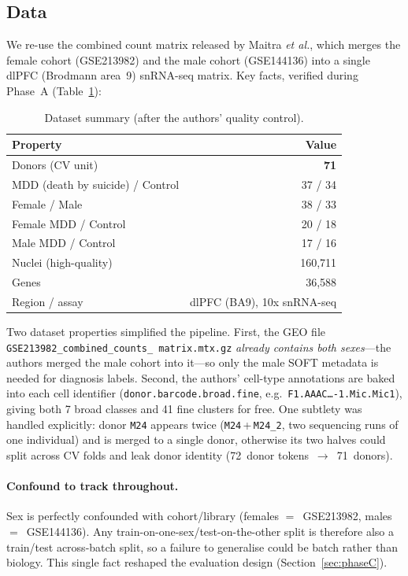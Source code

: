 \documentclass[11pt]{article}
\newcommand{\code}[1]{\texttt{\small #1}}
\begin{document}
\subsection{Data}

We re-use the combined count matrix released by Maitra \textit{et al.}, which
merges the female cohort (GSE213982) and the male cohort (GSE144136) into a
single dlPFC (Brodmann area~9) snRNA-seq matrix. Key facts, verified during
Phase~A (Table~\ref{tab:data}):

\begin{table}[h]
\centering
\caption{Dataset summary (after the authors' quality control).}
\label{tab:data}
\small
\begin{tabular}{lr}
\toprule
Property & Value \\
\midrule
Donors (CV unit) & \textbf{71} \\
\quad MDD (death by suicide) / Control & 37 / 34 \\
\quad Female / Male & 38 / 33 \\
\quad Female MDD / Control & 20 / 18 \\
\quad Male MDD / Control & 17 / 16 \\
Nuclei (high-quality) & 160{,}711 \\
Genes & 36{,}588 \\
Region / assay & dlPFC (BA9), 10x snRNA-seq \\
\bottomrule
\end{tabular}
\end{table}

Two dataset properties simplified the pipeline. First, the GEO file
\code{GSE213982\_\allowbreak combined\_\allowbreak counts\_\allowbreak
matrix.mtx.gz} \emph{already contains both sexes}---the authors merged the male cohort into it---so only the male SOFT
metadata is needed for diagnosis labels. Second, the authors' cell-type
annotations are baked into each cell identifier
(\code{donor.barcode.broad.fine}, e.g.\ \code{F1.AAAC\ldots-1.Mic.Mic1}),
giving both 7 broad classes and 41 fine clusters for free. One subtlety was
handled explicitly: donor \code{M24} appears twice (\code{M24}\,+\,\code{M24\_2},
two sequencing runs of one individual) and is merged to a single donor,
otherwise its two halves could split across CV folds and leak donor identity
(72~donor tokens~$\rightarrow$~71~donors).

\paragraph{Confound to track throughout.} Sex is perfectly confounded with
cohort/library (females $=$~GSE213982, males $=$~GSE144136). Any
train-on-one-sex/test-on-the-other split is therefore also a train/test
across-batch split, so a failure to generalise could be batch rather than
biology. This single fact reshaped the evaluation design (Section~\ref{sec:phaseC}).
\end{document}

